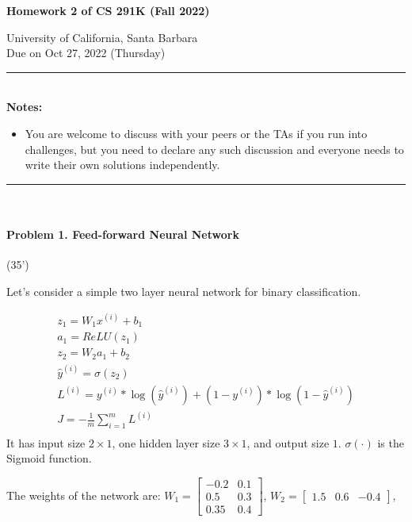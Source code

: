 \documentclass[11pt]{article}\pagestyle{plain}
\begin{document}
\begin{center}\textbf{{\LARGE Homework 2 of CS 291K (Fall 2022)}\\[.3in]}

{\large University of California, Santa Barbara}\\[.3in]
{\large Due on Oct 27, 2022 (Thursday)}\\[.1in]
\end{center}
\rule[-10pt]{16.5cm}{0.05em} \\ 
\newline
\textbf{Notes:}
\vspace{-1em}
\begin{itemize}
\item You are welcome to discuss with your peers or the TAs if you run into challenges, but you need to declare any such discussion and everyone needs to write their own solutions independently.
\end{itemize}
\vspace{-2em}
\rule[-10pt]{16.5cm}{0.05em} \\


\paragraph{Problem 1. Feed-forward Neural Network}  (35') 


Let's consider a simple two layer neural network for binary classification. 

\begin{gather*}
	z_1 = W_1x^{(i)} + b_1\\
	a_1 = ReLU(z_1)\\
	z_2 = W_2 a_1 + b_2\\
	\hat{y}^{(i)} = \sigma(z_2)\\
	L^{(i)} = y^{(i)}*\log(\hat{y}^{(i)}) + (1- y^{(i)})*\log(1 - \hat{y}^{(i)})\\
	J = -\frac{1}{m} \displaystyle \sum_{i=1}^{m}L^{(i)}\\
\end{gather*}
It has input size $2\times 1$, one hidden layer size $3\times 1$, and output size $1$. $\sigma(\cdot)$ is the Sigmoid function.


The weights of the network are: 
$
W_1=
\begin{bmatrix}
	-0.2 & 0.1\\
	0.5 & 0.3\\
	0.35 & 0.4
\end{bmatrix}
$,
$
W_2=
\begin{bmatrix}
	1.5 & 0.6 & -0.4
\end{bmatrix}
$,
\end{document}
